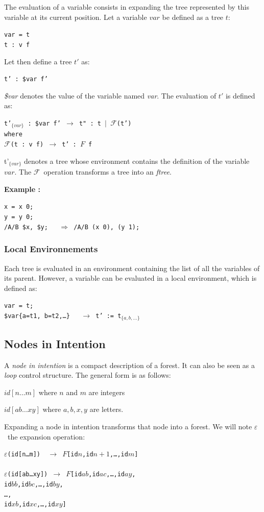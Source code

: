 \documentclass{article}
\newcommand{\exemple}	{\vspace*{1mm}\hspace*{-4mm}\textbf{Example :}}
\newcommand{\code}	[2][0.9]		{\vspace{0mm}\begin{center}\colorbox{mygrey}{
							\begin{minipage}[t]{#1\columnwidth} 
							{\small \texttt{#2}}
							\end{minipage}}\end{center}}
\newcommand{\op}	[1]		{\vspace{0mm}\begin{center}\colorbox{mygrey}{
							\begin{minipage}[t]{0.9\columnwidth} 
							{\small \texttt{#1}}
							\end{minipage}}\end{center}}
\newcommand{\seq}		{\ensuremath{|}}
\newcommand{\foret}		{\ensuremath{F}}
\newcommand{\toforet}	{\ensuremath{\mathcal{F}}}
\newcommand{\ftree}		{ftree}
\newcommand{\etc}		{…}
\newcommand{\nexpand}	{\ensuremath{\varepsilon}}
\newcommand{\ulc}		{\hspace*{37mm}}
\begin{document}
The evaluation of a variable consists in expanding the tree represented by this variable at its current position.
Let a variable $var$ be defined as a tree $t$:
\op{var = t \\
t :  v f
}
Let then define a tree $t'$ as:
\op{t' :  \$var f'}
\emph{\$var} denotes the value of the variable named \emph{var}. The evaluation of $t'$ is defined as:
\op{t'$_{\{var\}}$ :  \$var f' $\to$ t" : t \seq\ \toforet(t') \\
where \\
\toforet(t : v f) $\to$ t' : \foret\ f
}
t'$_{\{var\}}$ denotes a tree whose environment contains the definition of the variable $var$. The \toforet\ operation transforms a tree into an \emph{\ftree}.


\exemple
\code{x = x 0;\\
y = y 0;\\
/A/B \$x, \$y; \ \ $\Rightarrow$  /A/B (x 0), (y 1);}


\subsubsection{Local Environnements}

Each tree is evaluated in an environment containing the list of all the variables of its parent. However, a variable can be evaluated in a local environment, which is defined as:
\code{var = t;\\
\$var\{a=t1, b=t2,\etc\} \ \ $\to$  t' := t$_{\{a, b,\etc\}}$}



\subsection{Nodes in Intention}

A \emph{node in intention} is a compact description of a forest. It can also be seen as a \emph{loop} control structure. The general form is as follows:
\begin{description}
 \setlength\itemsep{0.0em}
\item $id[n…m]$ 	where $n$ and $m$ are integers
\item $id[ab…xy]$ where $a,b,x,y$ are letters.
\end{description}

Expanding a node in intention transforms that node into a forest. We will note \nexpand\ the expansion operation:
\code{\nexpand(id[n…m]) \ $\to$ \foret [id$n$,id$n+1$,…,id$m$]\\
\\
\nexpand(id[ab…xy]) $\to$ \foret [id$ab$,id$ac$,…,id$ay$,\\
\ulc id$bb$,id$bc$,…,id$by$,\\
\ulc …,\\
\ulc id$xb$,id$xc$,…,id$xy$]
}
\end{document}
